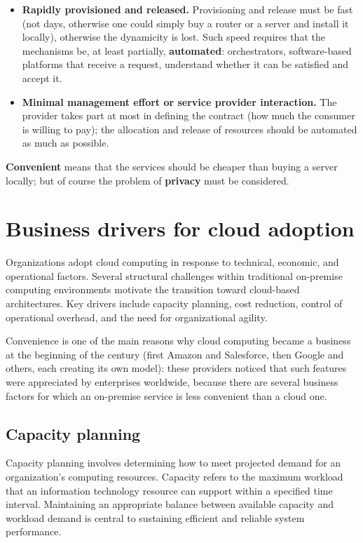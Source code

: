 \begin{itemize}
	\item \textbf{Rapidly provisioned and released.} Provisioning and release must be fast (not days, otherwise one could simply buy a router or a server and install it locally), otherwise the dynamicity is lost. Such speed requires that the mechanisms be, at least partially, \textbf{automated}: orchestrators, software-based platforms that receive a request, understand whether it can be satisfied and accept it.
	\item \textbf{Minimal management effort or service provider interaction.} The provider takes part at most in defining the contract (how much the consumer is willing to pay); the allocation and release of resources should be automated as much as possible.
\end{itemize}

\begin{notebox}
	\textbf{Convenient} means that the services should be cheaper than buying a server locally; but of course the problem of \textbf{privacy} must be considered.
\end{notebox}

\section{Business drivers for cloud adoption}

Organizations adopt cloud computing in response to technical, economic, and operational factors. Several structural challenges within traditional on-premise computing environments motivate the transition toward cloud-based architectures. Key drivers include capacity planning, cost reduction, control of operational overhead, and the need for organizational agility.

Convenience is one of the main reasons why cloud computing became a business at the beginning of the century (first Amazon and Salesforce, then Google and others, each creating its own model): these providers noticed that such features were appreciated by enterprises worldwide, because there are several business factors for which an on-premise service is less convenient than a cloud one.

\subsection{Capacity planning}

Capacity planning involves determining how to meet projected demand for an organization's computing resources. Capacity refers to the maximum workload that an information technology resource can support within a specified time interval. Maintaining an appropriate balance between available capacity and workload demand is central to sustaining efficient and reliable system performance.

